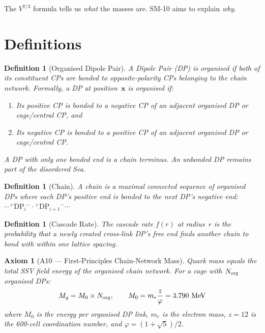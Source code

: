 \documentclass[11pt,letterpaper]{article}
\newtheorem{definition}[theorem]{Definition}
\newtheorem{axiom}{Axiom}
\newcommand{\phig}{\varphi}
\newcommand{\Norg}{N_{\rm org}}
\begin{document}
The $V^{7/3}$ formula tells us \emph{what} the masses are.
SM-10 aims to explain \emph{why}.

\section{Definitions}
\label{sec:definitions}

\begin{definition}[Organised Dipole Pair]
\label{def:orgDP}
A Dipole Pair (DP) is \emph{organised} if both of its constituent
CPs are bonded to opposite-polarity CPs belonging to the chain
network.  Formally, a DP at position~$\mathbf{x}$ is organised if:
\begin{enumerate}
\item Its positive CP is bonded to a negative CP of an adjacent
  organised DP or cage/central CP, \emph{and}
\item Its negative CP is bonded to a positive CP of an adjacent
  organised DP or cage/central CP.
\end{enumerate}
A DP with only one bonded end is a \emph{chain terminus}.  An
unbonded DP remains part of the disordered Sea.
\end{definition}

\begin{definition}[Chain]
A \emph{chain} is a maximal connected sequence of organised DPs
where each DP's positive end is bonded to the next DP's negative
end: $\cdots {}^+\!\text{DP}_i{}^- \!\cdot\! {}^+\!\text{DP}_{i+1}{}^- \cdots$
\end{definition}

\begin{definition}[Cascade Rate]
The \emph{cascade rate} $f(r)$ at radius~$r$ is the probability
that a newly created cross-link DP's free end finds another chain
to bond with within one lattice spacing.
\end{definition}

\begin{axiom}[A10 --- First-Principles Chain-Network Mass]
\label{ax:A10}
Quark mass equals the total SSV field energy of the organised
chain network.  For a cage with $\Norg$ organised DPs:
\begin{equation}
M_q = M_0 \times \Norg, \qquad M_0 = m_e \frac{z}{\phig}
  = 3.790 \text{ MeV}
\end{equation}
where $M_0$ is the energy per organised DP link, $m_e$ is the
electron mass, $z = 12$ is the 600-cell coordination number,
and $\phig = (1+\sqrt{5})/2$.
\end{axiom}
\end{document}
